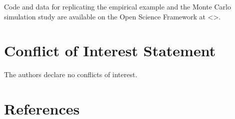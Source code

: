 \documentclass[
  man, donotrepeattitle,floatsintext]{apa7}
\begin{document}
Code and data for replicating the empirical example and the Monte Carlo simulation study are available on the Open Science Framework at \textless\textgreater.

\section*{Conflict of Interest Statement}\label{conflict-of-interest-statement}

The authors declare no conflicts of interest.

\newpage

\section*{References}\label{references}

\begingroup
\setlength{\parindent}{-0.5in}
\end{document}
